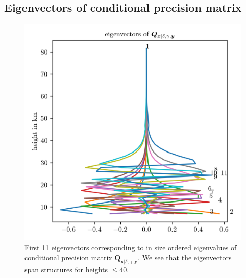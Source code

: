 \subsection{Eigenvectors of conditional precision matrix}
 \begin{figure}[ht!]
 	\centering
 	\includegraphics{CovEigVec1.png}
 	\caption[First 11 eigenvectors of conditional precision matrix.]{First 11 eigenvectors corresponding to in size ordered eigenvalues of conditional precision matrix $\bm{Q}_{ \bm{x}|\delta, \gamma, \bm{y}}$.
 	We see that the eigenvectors span structures for heights $\leq 40$.}
 	\label{fig:CovEigVec1}
 \end{figure}
